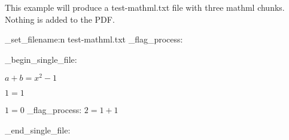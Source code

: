 \documentclass{article}
\begin{document}
This example will produce a test-mathml.txt file with three mathml chunks.
Nothing is added to the PDF.
\ExplSyntaxOn

\luamml_set_filename:n {test-mathml.txt}
{}
\luamml_flag_process: 

\luamml_begin_single_file:

\ExplSyntaxOff

$a+b=x^2 -1 $

$1=1$


\ExplSyntaxOn
$1=0$
\newpage
\luamml_flag_process: 
$ 2=1+1 $


\luamml_end_single_file:
\ExplSyntaxOff
\end{document}
